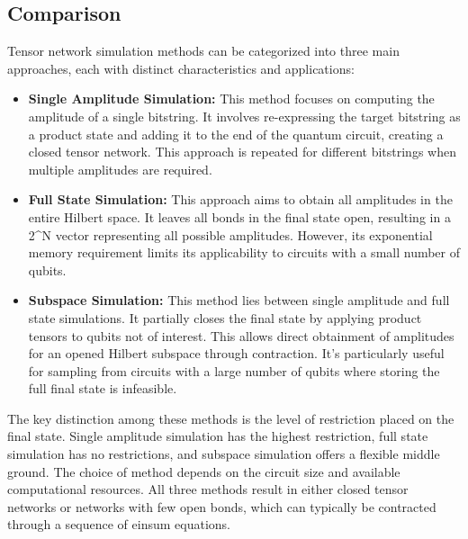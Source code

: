 \documentclass[12pt,oneside,a4paper]{article}
\begin{document}

\subsection{Comparison}
Tensor network simulation methods can be categorized into three main approaches, each with distinct characteristics and applications:

\begin{itemize}
	\item \textbf{Single Amplitude Simulation:} This method focuses on computing the amplitude of a single bitstring. It involves re-expressing the target bitstring as a product state and adding it to the end of the quantum circuit, creating a closed tensor network. This approach is repeated for different bitstrings when multiple amplitudes are required.
	\item \textbf{Full State Simulation:} This approach aims to obtain all amplitudes in the entire Hilbert space. It leaves all bonds in the final state open, resulting in a 2^N vector representing all possible amplitudes. However, its exponential memory requirement limits its applicability to circuits with a small number of qubits.
	\item \textbf{Subspace Simulation:} This method lies between single amplitude and full state simulations. It partially closes the final state by applying product tensors to qubits not of interest. This allows direct obtainment of amplitudes for an opened Hilbert subspace through contraction. It's particularly useful for sampling from circuits with a large number of qubits where storing the full final state is infeasible.
\end{itemize}
The key distinction among these methods is the level of restriction placed on the final state. Single amplitude simulation has the highest restriction, full state simulation has no restrictions, and subspace simulation offers a flexible middle ground. The choice of method depends on the circuit size and available computational resources.
All three methods result in either closed tensor networks or networks with few open bonds, which can typically be contracted through a sequence of einsum equations.

\end{document}
